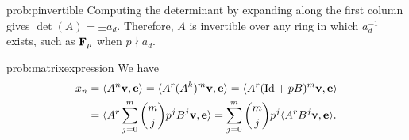 \begin{sol}{prob:pinvertible} Computing the determinant by expanding along the first column gives $\det(A) = \pm a_d$. Therefore, $A$ is invertible over any ring in which $a_d^{-1}$ exists, such as $\mathbf{F}_p$ when $p\nmid a_d$.
\end{sol}

\begin{sol}{prob:matrixexpression} We have
\begin{align*} x_n &= \langle A^n \textbf{v}, \textbf{e}\rangle = \langle A^r (A^k)^m\textbf{v}, \textbf{e}\rangle =  \langle A^r (\mathrm{Id} + pB)^m\textbf{v}, \textbf{e}\rangle \\
&= \langle A^r \sum_{j=0}^{m} \binom{m}{j} p^j B^j \textbf{v},\textbf{e} \rangle= \sum_{j=0}^{m} \binom{m}{j} p^j \langle A^r B^j \textbf{v}, \textbf{e}\rangle.
\end{align*}
\end{sol}

